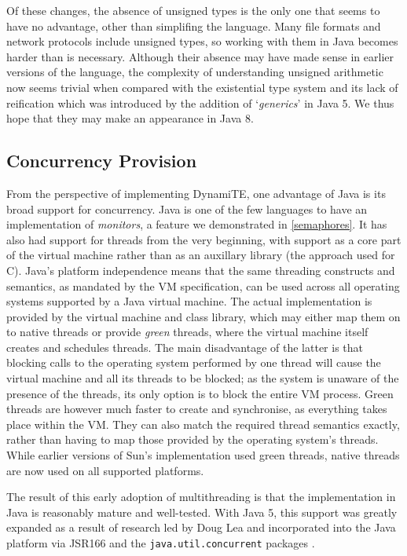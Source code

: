 Of these changes, the absence of unsigned types is the only one that
seems to have no advantage, other than simplifing the language.  Many
file formats and network protocols include unsigned types, so working
with them in Java becomes harder than is necessary.  Although their
absence may have made sense in earlier versions of the language, the
complexity of understanding unsigned arithmetic now seems trivial when
compared with the existential type system and its lack of reification
which was introduced by the addition of `\emph{generics}' in Java 5.
We thus hope that they may make an appearance in Java 8.

\subsection{Concurrency Provision}
\label{java:concurrency}

From the perspective of implementing DynamiTE, one advantage of Java
is its broad support for concurrency.  Java is one of the few
languages to have an implementation of \emph{monitors}, a feature we
demonstrated in \ref{semaphores}.  It has also had support for threads
from the very beginning, with support as a core part of the virtual
machine rather than as an auxillary library (the approach used for C).
Java's platform independence means that the same threading constructs
and semantics, as mandated by the VM specification\cite{vmspec}, can
be used across all operating systems supported by a Java virtual
machine.  The actual implementation is provided by the virtual machine
and class library, which may either map them on to native threads or
provide \emph{green} threads, where the virtual machine itself creates
and schedules threads.  The main disadvantage of the latter is that
blocking calls to the operating system performed by one thread will
cause the virtual machine and all its threads to be blocked; as the
system is unaware of the presence of the threads, its only option is
to block the entire VM process.  Green threads are however much faster
to create and synchronise, as everything takes place within the VM.
They can also match the required thread semantics exactly, rather than
having to map those provided by the operating system's threads.  While
earlier versions of Sun's implementation used green threads, native
threads are now used on all supported platforms.

The result of this early adoption of multithreading is that the
implementation in Java is reasonably mature and well-tested.  With
Java 5, this support was greatly expanded as a result of research led
by Doug Lea and incorporated into the Java platform via JSR166 and the
\texttt{java.util.concurrent} packages \cite{jsr166, concpractice}.

